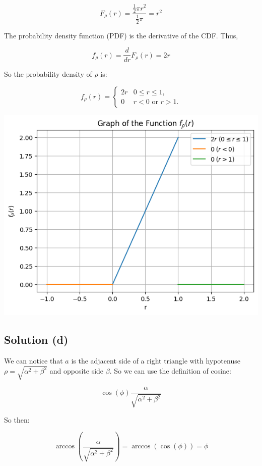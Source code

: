 \[ F_{\rho}(r) = \frac{\frac{1}{2} \pi r^2}{\frac{1}{2} \pi} = r^2 \]

The probability density function (PDF) is the derivative of the CDF. Thus,

\[ f_{\rho}(r) = \frac{d}{dr} F_{\rho}(r) = 2r \]

So the probability density of \(\rho\) is:

\begin{equation}
    f_\rho(r) =
    \begin{cases}
        2r & 0 \leq r \leq 1,         \\
        0  & r < 0 \text{ or } r > 1.
    \end{cases}
\end{equation}

\includegraphics[width=\textwidth]{images/p1.png}

\subsection*{Solution (d)}

We can notice that $a$ is the adjacent side of a right triangle
with hypotenuse $\rho = \sqrt{\alpha^2 + \beta^2}$ and opposite
side $\beta$. So we can use the definition of cosine:

\begin{equation}
    \cos(\phi)  \frac{\alpha}{\sqrt{\alpha^2 + \beta^2}}
\end{equation}

So then:

\begin{equation}
    \arccos(\frac{\alpha}{\sqrt{\alpha^2 + \beta^2}}) = \arccos(\cos(\phi)) = \phi
\end{equation}

